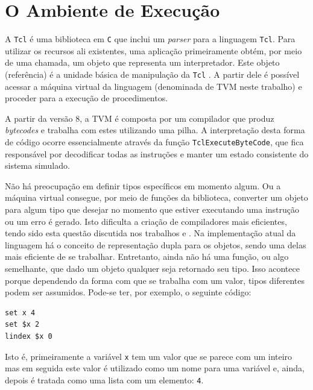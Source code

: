 


\section{O Ambiente de Execução}
\label{ambientexec1}


A \texttt{Tcl} é uma biblioteca em \texttt{C} que inclui um
\textit{parser} para a linguagem \texttt{Tcl}. Para utilizar os
recursos ali existentes, uma aplicação primeiramente obtém, por meio
de uma chamada, um objeto que representa um interpretador. Este objeto
(referência) é a unidade básica de manipulação
da \texttt{Tcl} \cite{ousterhout_89}. A partir dele é possível
acessar a máquina virtual da linguagem (denominada de TVM neste trabalho) e
proceder para a execução de procedimentos.

A partir da versão 8, a TVM é composta por um compilador que produz
\textit{bytecodes} e trabalha com estes utilizando uma pilha. A
interpretação desta forma de código ocorre essencialmente através da
função \verb!TclExecuteByteCode!, que fica responsável por decodificar
todas as instruções e manter um estado consistente do sistema
simulado.


Não há preocupação em definir tipos específicos em momento
algum. Ou a máquina virtual consegue, por meio de funções da
biblioteca, converter um objeto para algum tipo que desejar no momento
que estiver executando uma instrução ou um erro é gerado. Isto
dificulta a criação de compiladores mais eficientes, tendo sido esta
questão discutida nos trabalhos \cite{sah_tc} e
\cite{tcl_bytecode}. Na implementação atual da linguagem há o conceito
de representação dupla para os objetos, sendo uma delas mais eficiente
de se trabalhar. Entretanto, ainda não há uma função, ou algo
semelhante, que dado um objeto qualquer seja retornado seu tipo. Isso
acontece porque dependendo da forma com que se trabalha com um valor,
tipos diferentes podem ser assumidos. Pode-se ter, por exemplo, o
seguinte código:
\begin{verbatim}
set x 4
set $x 2
lindex $x 0
\end{verbatim}
Isto é, primeiramente a variável \verb!x! tem um valor que se parece
com um inteiro mas em seguida este valor é utilizado como um nome para uma
variável e, ainda, depois é tratada como uma lista com um elemento: \verb!4!.

